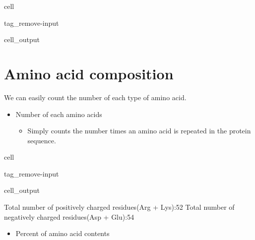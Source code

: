 \documentclass[letterpaper,10pt,english]{jupyterBook}
\begin{document}
\begin{sphinxuseclass}{cell}
\begin{sphinxuseclass}{tag_remove-input}\begin{sphinxVerbatimOutput}

\begin{sphinxuseclass}{cell_output}
\noindent{}

\end{sphinxuseclass}\end{sphinxVerbatimOutput}

\end{sphinxuseclass}
\end{sphinxuseclass}

\section{Amino acid composition}
\label{\detokenize{ipynb/chapter1:amino-acid-composition}}
\sphinxAtStartPar
We can easily count the number of each type of amino acid.
\begin{itemize}
\item {} 
\sphinxAtStartPar
Number of each amino acids
\begin{itemize}
\item {} 
\sphinxAtStartPar
Simply counts the number times an amino acid is repeated in the protein sequence.

\end{itemize}

\end{itemize}

\begin{sphinxuseclass}{cell}
\begin{sphinxuseclass}{tag_remove-input}\begin{sphinxVerbatimOutput}

\begin{sphinxuseclass}{cell_output}
\begin{sphinxVerbatim}[commandchars=\\\{\}]
Total number of positively charged residues(Arg + Lys):\PYGZhy{}\PYGZhy{}\PYGZhy{}\PYGZhy{}\PYGZhy{}\PYGZhy{}\PYGZhy{}\PYGZhy{}52
Total number of negatively charged residues(Asp + Glu):\PYGZhy{}\PYGZhy{}\PYGZhy{}\PYGZhy{}\PYGZhy{}\PYGZhy{}\PYGZhy{}\PYGZhy{}54
\end{sphinxVerbatim}

\noindent{}

\end{sphinxuseclass}\end{sphinxVerbatimOutput}

\end{sphinxuseclass}
\end{sphinxuseclass}\begin{itemize}
\item {} 
\sphinxAtStartPar
Percent of amino acid contents

\end{itemize}
\end{document}
